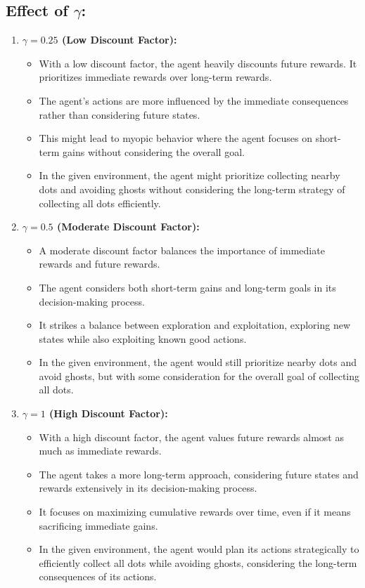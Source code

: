 \documentclass[12pt,onecolumn,a4paper]{article}
\begin{document}
\subsection*{Effect of $\gamma$:}
\begin{enumerate}
	\item{\textbf{$\gamma = 0.25$ (Low Discount Factor):}}
	\begin{itemize}
		\item With a low discount factor, the agent heavily discounts future rewards. It prioritizes immediate rewards over long-term rewards.
		\item The agent's actions are more influenced by the immediate consequences rather than considering future states.
		\item This might lead to myopic behavior where the agent focuses on short-term gains without considering the overall goal.
		\item In the given environment, the agent might prioritize collecting nearby dots and avoiding ghosts without considering the long-term strategy of collecting all dots efficiently.
	\end{itemize}
	\item{\textbf{$\gamma = 0.5$ (Moderate Discount Factor):}}
	\begin{itemize}
		\item A moderate discount factor balances the importance of immediate rewards and future rewards.
		\item The agent considers both short-term gains and long-term goals in its decision-making process.
		\item It strikes a balance between exploration and exploitation, exploring new states while also exploiting known good actions.
		\item In the given environment, the agent would still prioritize nearby dots and avoid ghosts, but with some consideration for the overall goal of collecting all dots.
	\end{itemize}
	\item{\textbf{$\gamma = 1$ (High Discount Factor):}}
	\begin{itemize}
		\item With a high discount factor, the agent values future rewards almost as much as immediate rewards.
		\item The agent takes a more long-term approach, considering future states and rewards extensively in its decision-making process.
		\item It focuses on maximizing cumulative rewards over time, even if it means sacrificing immediate gains.
		\item In the given environment, the agent would plan its actions strategically to efficiently collect all dots while avoiding ghosts, considering the long-term consequences of its actions.
	\end{itemize}
\end{enumerate}
\end{document}
